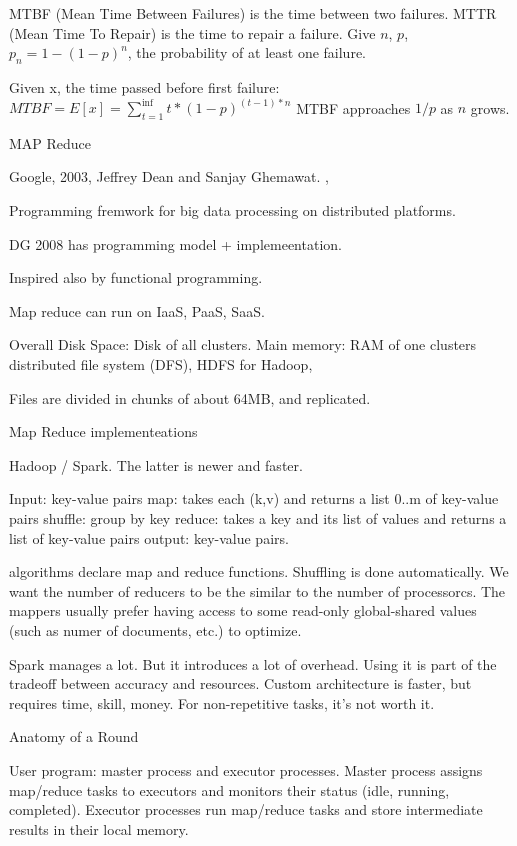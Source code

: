 \documentclass[a4paper]{tufte-handout} %
\begin{document}
MTBF (Mean Time Between Failures) is the time between two failures. MTTR (Mean Time To Repair) is the time to repair a failure.
Give $n$, $p$, $p_n = 1 - (1-p)^n$, the probability of at least one failure.

Given x, the time passed before first failure:
$MTBF = E[x] = \sum_{t=1}^{\inf} t * (1-p)^{(t-1)*n}$
MTBF approaches $1/p$ as $n$ grows.

MAP Reduce

Google, 2003, Jeffrey Dean and Sanjay Ghemawat. \cite{ghemawat2003google}, \cite{dean2004mapreduce}

Programming fremwork for big data processing on distributed platforms. 

DG 2008 has programming model + implemeentation. \cite{dean2008mapreduce}

Inspired also by functional programming.

Map reduce can run on IaaS, PaaS, SaaS.

Overall Disk Space: Disk of all clusters.
Main memory: RAM of one clusters
distributed file system (DFS), HDFS for Hadoop,

Files are divided in chunks of about 64MB, and replicated.

Map Reduce implementeations

Hadoop / Spark. The latter is newer and faster. 

Input: key-value pairs
map: takes each (k,v) and returns a list 0..m of key-value pairs
shuffle: group by key
reduce: takes a key and its list of values and returns a list of key-value pairs
output: key-value pairs.

algorithms declare map and reduce functions. Shuffling is done automatically.
We want the number of reducers to be the similar to the number of processorcs.
The mappers usually prefer having access to some read-only global-shared values (such as numer of documents, etc.) to optimize.

Spark manages a lot. But it introduces a lot of overhead. Using it is part of the tradeoff between accuracy and resources.
Custom architecture is faster, but requires time, skill, money. For non-repetitive tasks, it's not worth it.

Anatomy of a Round

User program: master process and executor processes.
Master process assigns map/reduce tasks to executors and monitors their status (idle, running, completed).
Executor processes run map/reduce tasks and store intermediate results in their local memory.
\end{document}
